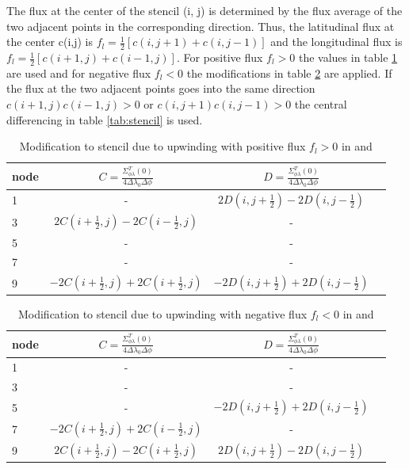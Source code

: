 %
The flux at the center of the stencil (i, j) is 
determined by the flux average of the two adjacent points in the corresponding
direction. Thus, the latitudinal flux at the center c(i,j) is $f_l= \frac{1}{2}
[c(i,j+1) +c(i,j-1) ]$  and the longitudinal flux is  $f_l= \frac{1}{2}
[c(i+1,j) +c(i-1,j) ]$. For positive flux $f_l >0$ the values in table
 \ref{tab:stencil_upp} are used and for negative  flux $f_l <0$ the
 modifications in table
 \ref{tab:stencil_upm} are applied. If the flux at the two adjacent points goes into the
 same direction $c(i+1,j)c(i-1,j)> 0$ or $c(i,j+1)c(i,j-1)> 0$ the 
 central differencing in table \ref{tab:stencil} is used.
%
\begin{table}[tb]
\begin{tabular}{|p{0.5cm} ||c|c|c|} \hline
 node  & $ C= \frac{\Sigma_{\phi \lambda}^T(0)}{4\Delta \lambda_0 \Delta \phi }$
       & $D= \frac{\Sigma_{\phi \lambda}^T(0)}{4 \Delta \lambda_0 \Delta \phi} $ \\ \hline \hline
%
1  & - &$2 D(i,j+\frac{1}{2})-2 D(i,j-\frac{1}{2})$	\\ 
3  &$2 C(i+\frac{1}{2},j)- 2 C(i-\frac{1}{2},j)$ & -	\\ 
5  & - &-	\\ 
7  & - &-	\\ 
9  &$-2 C(i+\frac{1}{2},j)+2 C(i+\frac{1}{2},j)$  &$-2 D(i,j+\frac{1}{2})+2 D(i,j-\frac{1}{2})$	\\ \hline
%
\end{tabular}
\caption{Modification to stencil due to upwinding with positive flux $f_l >0$
in  and }
\label{tab:stencil_upp}
\end{table} 
%
\begin{table}[tb]
\begin{tabular}{|p{0.5cm} ||c|c|c|} \hline
 node  &$ C= \frac{\Sigma_{\phi \lambda}^T(0)}{4\Delta \lambda_0 \Delta \phi }$
       &$ D= \frac{\Sigma_{\phi \lambda}^T(0)}{4 \Delta \lambda_0 \Delta \phi}$  \\ \hline \hline
%
1  & - &-	\\ 
3  & - & -	\\ 
5  & - &$-2 D(i,j+\frac{1}{2})+2 D(i,j-\frac{1}{2})$	\\ 
7  &$-2 C(i+\frac{1}{2},j)+ 2 C(i-\frac{1}{2},j) $ &-	\\ 
9  & $2 C(i+\frac{1}{2},j)-2 C(i+\frac{1}{2},j)$   &$2 D(i,j+\frac{1}{2})-2 D(i,j-\frac{1}{2})$	\\ \hline
%
\end{tabular}
\caption{Modification to stencil due to upwinding with negative flux $f_l <0$
in  and }
\label{tab:stencil_upm}
\end{table} 
%
